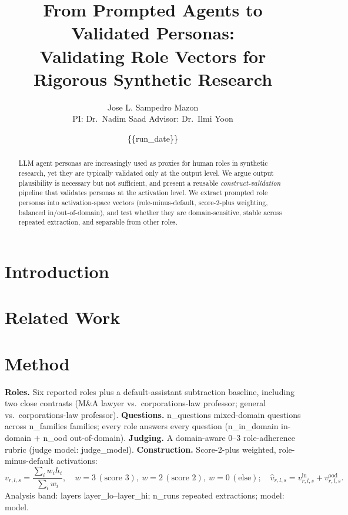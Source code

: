 \documentclass[11pt]{article}
\title{From Prompted Agents to Validated Personas:\\
Validating Role Vectors for Rigorous Synthetic Research}
\author{Jose L. Sampedro Mazon \\
\small PI: Dr.\ Nadim Saad \quad Advisor: Dr.\ Ilmi Yoon}
\date{{\{}\{run\_date\}{\}}}
\begin{document}
\maketitle

\begin{abstract}
LLM agent personas are increasingly used as proxies for human roles in synthetic research, yet they
are typically validated only at the output level. We argue output plausibility is necessary but not
sufficient, and present a reusable \emph{construct-validation} pipeline that validates personas at the
activation level. We extract prompted role personas into activation-space vectors
(role-minus-default, score-2-plus weighting, balanced in/out-of-domain), and test whether they are
domain-sensitive, stable across repeated extraction, and separable from other roles. %
\end{abstract}

\section{Introduction}

\section{Related Work}

\section{Method}
\textbf{Roles.} Six reported roles plus a default-assistant subtraction baseline, including two close
contrasts (M\&A lawyer vs.\ corporations-law professor; general vs.\ corporations-law professor).
\textbf{Questions.} {{n\_questions}} mixed-domain questions across {{n\_families}} families; every role
answers every question ({{n\_in\_domain}} in-domain $+$ {{n\_ood}} out-of-domain).
\textbf{Judging.} A domain-aware $0$--$3$ role-adherence rubric (judge model: {{judge\_model}}).
\textbf{Construction.} Score-2-plus weighted, role-minus-default activations:
\[ v_{r,l,s} = \frac{\sum_i w_i h_i}{\sum_i w_i},\quad w=3\,(\text{score }3),\ w=2\,(\text{score }2),\ w=0\,(\text{else}); \quad
\hat v_{r,l,s} = v^{\text{in}}_{r,l,s} + v^{\text{ood}}_{r,l,s}. \]
Analysis band: layers {{layer\_lo}}--{{layer\_hi}}; {{n\_runs}} repeated extractions; model: {{model}}.
\end{document}

